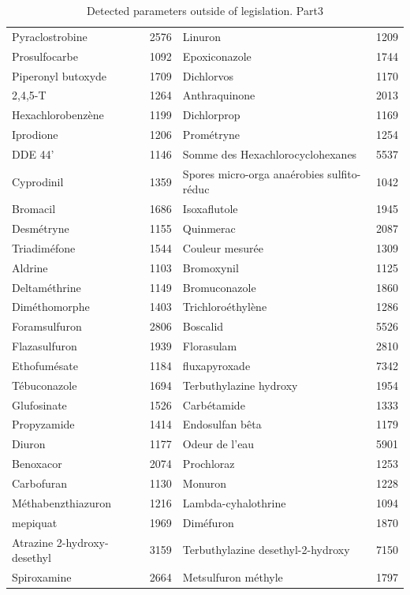 \documentclass{article}
\begin{document}
\begin{table}[H]
{\begin{tabular}{|l|l||l|l|}
    Pyraclostrobine & 2576 & Linuron & 1209 \\
    Prosulfocarbe & 1092 & Epoxiconazole & 1744 \\
    Piperonyl butoxyde & 1709 & Dichlorvos & 1170 \\
    2,4,5-T & 1264 & Anthraquinone & 2013 \\
    Hexachlorobenzène & 1199 & Dichlorprop & 1169 \\
    Iprodione & 1206 & Prométryne & 1254 \\
    DDE 44' & 1146 & Somme des Hexachlorocyclohexanes & 5537 \\
    Cyprodinil & 1359 & Spores micro-orga anaérobies sulfito-réduc & 1042 \\
    Bromacil & 1686 & Isoxaflutole & 1945 \\
    Desmétryne & 1155 & Quinmerac & 2087 \\
    Triadiméfone & 1544 & Couleur mesurée & 1309 \\
    Aldrine & 1103 & Bromoxynil & 1125 \\
    Deltaméthrine & 1149 & Bromuconazole & 1860 \\
    Diméthomorphe & 1403 & Trichloroéthylène & 1286 \\
    Foramsulfuron & 2806 & Boscalid & 5526 \\
    Flazasulfuron & 1939 & Florasulam & 2810 \\
    Ethofumésate & 1184 & fluxapyroxade & 7342 \\
    Tébuconazole & 1694 & Terbuthylazine hydroxy & 1954 \\
    Glufosinate & 1526 & Carbétamide & 1333 \\
    Propyzamide & 1414 & Endosulfan bêta & 1179 \\
    Diuron & 1177 & Odeur de l’eau & 5901 \\
    Benoxacor & 2074 & Prochloraz & 1253 \\
    Carbofuran & 1130 & Monuron & 1228 \\
    Méthabenzthiazuron & 1216 & Lambda-cyhalothrine & 1094 \\
    mepiquat & 1969 & Diméfuron & 1870 \\
    Atrazine 2-hydroxy-desethyl & 3159 & Terbuthylazine desethyl-2-hydroxy & 7150 \\
    Spiroxamine & 2664 & Metsulfuron méthyle & 1797 \\
    \hline
    \end{tabular}
}
\caption{Detected parameters outside of legislation. Part3}
\end{table}
\end{document}
